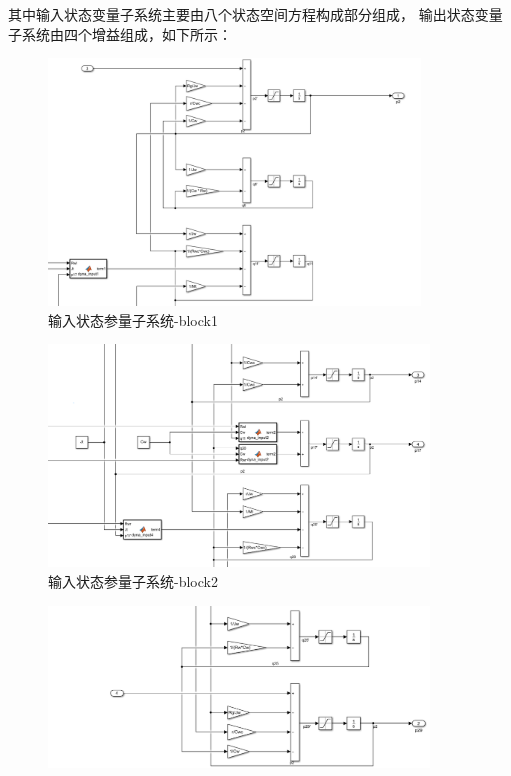 \begin{itemize}
	其中输入状态变量子系统主要由八个状态空间方程构成部分组成，	输出状态变量子系统由四个增益组成，如下所示：
	\begin{figure}[htbp]
		\centering
		\includegraphics[width=0.88\textwidth]{fig/simulink/MPW_simulink_block1.png}
		\caption{输入状态参量子系统-block1}
	\end{figure}
	\begin{figure}[ht]
		\centering
		\includegraphics[width=0.9\textwidth]{fig/simulink/MPW_simulink_block2.png}
		\caption{输入状态参量子系统-block2}
	\end{figure}
	\begin{figure}[ht]
		\centering
		\includegraphics[width=0.9\textwidth]{fig/simulink/MPW_simulink_block3.png}

\end{figure}
\end{itemize}
